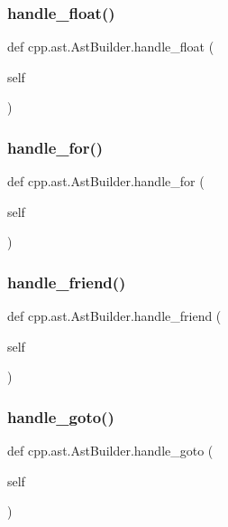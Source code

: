\subsubsection{\texorpdfstring{handle\_float()}{handle\_float()}}
{\footnotesize\ttfamily def cpp.\+ast.\+Ast\+Builder.\+handle\+\_\+float (\begin{DoxyParamCaption}\item[{}]{self }\end{DoxyParamCaption})}

\mbox{\label{classcpp_1_1ast_1_1AstBuilder_a0025c4d8ca779d69552e0947665eb1c4}} 
\subsubsection{\texorpdfstring{handle\_for()}{handle\_for()}}
{\footnotesize\ttfamily def cpp.\+ast.\+Ast\+Builder.\+handle\+\_\+for (\begin{DoxyParamCaption}\item[{}]{self }\end{DoxyParamCaption})}

\mbox{\label{classcpp_1_1ast_1_1AstBuilder_ab9f7d81019317c6ccfd492bd2c0c9579}} 
\subsubsection{\texorpdfstring{handle\_friend()}{handle\_friend()}}
{\footnotesize\ttfamily def cpp.\+ast.\+Ast\+Builder.\+handle\+\_\+friend (\begin{DoxyParamCaption}\item[{}]{self }\end{DoxyParamCaption})}

\mbox{\label{classcpp_1_1ast_1_1AstBuilder_a8504d788bb1541ee581918d52d1f4132}} 
\subsubsection{\texorpdfstring{handle\_goto()}{handle\_goto()}}
{\footnotesize\ttfamily def cpp.\+ast.\+Ast\+Builder.\+handle\+\_\+goto (\begin{DoxyParamCaption}\item[{}]{self }\end{DoxyParamCaption})}

